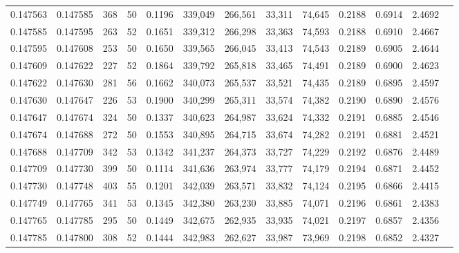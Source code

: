 \begin{tabular}{rrrrrrrrrrrrr}
0.147563 & 0.147585 &   368 &  50 &                                     0.1196 & 339,049 & 266,561 &  33,311 &  74,645 & 0.2188 & 0.6914 & 2.4692 \\
0.147585 & 0.147595 &   263 &  52 &                                     0.1651 & 339,312 & 266,298 &  33,363 &  74,593 & 0.2188 & 0.6910 & 2.4667 \\
0.147595 & 0.147608 &   253 &  50 &                                     0.1650 & 339,565 & 266,045 &  33,413 &  74,543 & 0.2189 & 0.6905 & 2.4644 \\
0.147609 & 0.147622 &   227 &  52 &                                     0.1864 & 339,792 & 265,818 &  33,465 &  74,491 & 0.2189 & 0.6900 & 2.4623 \\
0.147622 & 0.147630 &   281 &  56 &                                     0.1662 & 340,073 & 265,537 &  33,521 &  74,435 & 0.2189 & 0.6895 & 2.4597 \\
0.147630 & 0.147647 &   226 &  53 &                                     0.1900 & 340,299 & 265,311 &  33,574 &  74,382 & 0.2190 & 0.6890 & 2.4576 \\
0.147647 & 0.147674 &   324 &  50 &                                     0.1337 & 340,623 & 264,987 &  33,624 &  74,332 & 0.2191 & 0.6885 & 2.4546 \\
0.147674 & 0.147688 &   272 &  50 &                                     0.1553 & 340,895 & 264,715 &  33,674 &  74,282 & 0.2191 & 0.6881 & 2.4521 \\
0.147688 & 0.147709 &   342 &  53 &                                     0.1342 & 341,237 & 264,373 &  33,727 &  74,229 & 0.2192 & 0.6876 & 2.4489 \\
0.147709 & 0.147730 &   399 &  50 &                                     0.1114 & 341,636 & 263,974 &  33,777 &  74,179 & 0.2194 & 0.6871 & 2.4452 \\
0.147730 & 0.147748 &   403 &  55 &                                     0.1201 & 342,039 & 263,571 &  33,832 &  74,124 & 0.2195 & 0.6866 & 2.4415 \\
0.147749 & 0.147765 &   341 &  53 &                                     0.1345 & 342,380 & 263,230 &  33,885 &  74,071 & 0.2196 & 0.6861 & 2.4383 \\
0.147765 & 0.147785 &   295 &  50 &                                     0.1449 & 342,675 & 262,935 &  33,935 &  74,021 & 0.2197 & 0.6857 & 2.4356 \\
0.147785 & 0.147800 &   308 &  52 &                                     0.1444 & 342,983 & 262,627 &  33,987 &  73,969 & 0.2198 & 0.6852 & 2.4327 \\

\end{tabular}
